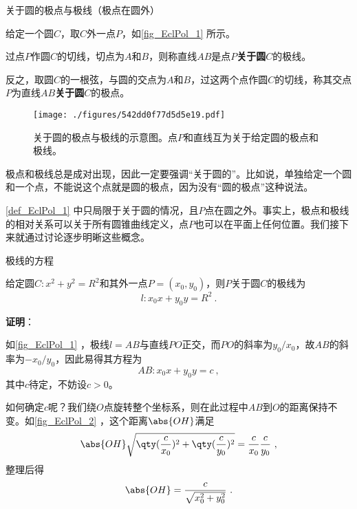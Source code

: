 





\begin{definition}{关于圆的极点与极线（极点在圆外）}\label{def_EclPol_1}

给定一个圆$C$，取$C$外一点$P$，如\autoref{fig_EclPol_1} 所示。

过点$P$作圆$C$的切线，切点为$A$和$B$，则称直线$AB$是点$P$\textbf{关于圆}$C$的极线。

反之，取圆$C$的一根弦，与圆的交点为$A$和$B$，过这两个点作圆$C$的切线，称其交点$P$为直线$AB$\textbf{关于圆}$C$的极点。

\begin{figure}[ht]
\centering
\texttt{[image: ./figures/542dd0f77d5d5e19.pdf]}
\caption{关于圆的极点与极线的示意图。点$P$和直线互为关于给定圆的极点和极线。} \label{fig_EclPol_1}
\end{figure}

\end{definition}




极点和极线总是成对出现，因此一定要强调“关于圆的”。比如说，单独给定一个圆和一个点，不能说这个点就是圆的极点，因为没有“圆的极点”这种说法。

\autoref{def_EclPol_1} 中只局限于关于圆的情况，且$P$点在圆之外。事实上，极点和极线的相对关系可以关于所有圆锥曲线定义，点$P$也可以在平面上任何位置。我们接下来就通过讨论逐步明晰这些概念。




\begin{theorem}{极线的方程}\label{the_EclPol_1}

给定圆$C:x^2+y^2=R^2$和其外一点$P=(x_0, y_0)$，则$P$关于圆$C$的极线为
\begin{equation}
l: x_0x+y_0y = R^2~. 
\end{equation}

\end{theorem}



\textbf{证明}：

如\autoref{fig_EclPol_1} ，极线$l=AB$与直线$PO$正交，而$PO$的斜率为$y_0/x_0$，故$AB$的斜率为$-x_0/y_0$，因此易得其方程为
\begin{equation}
AB: x_0x+y_0y=c~, 
\end{equation}
其中$c$待定，不妨设$c>0$。

如何确定$c$呢？我们绕$O$点旋转整个坐标系，则在此过程中$AB$到$O$的距离保持不变。如\autoref{fig_EclPol_2} ，这个距离$\abs{OH}$满足
\begin{equation}
\abs{OH}\sqrt{\qty(\frac{c}{x_0})^2+\qty(\frac{c}{y_0})^2} = \frac{c}{x_0}\frac{c}{y_0}~, 
\end{equation}
整理后得
\begin{equation}
\abs{OH}=\frac{c}{\sqrt{x_0^2+y_0^2}}~. 
\end{equation}

